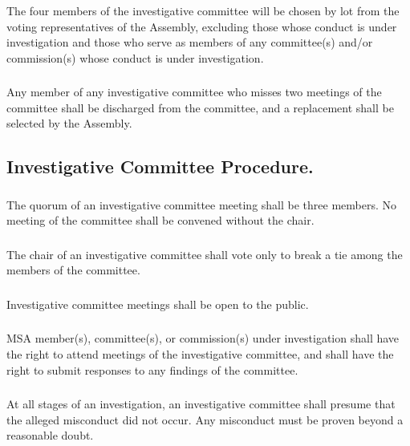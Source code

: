 \documentclass{rules}
\begin{document}
\subsubsection{}
The four members of the investigative committee will be chosen by lot from the voting representatives of the Assembly, excluding those whose conduct is under investigation and those who serve as members of any committee(s) and/or commission(s) whose conduct is under investigation.
\subsubsection{}
Any member of any investigative committee who misses two meetings of the committee shall be discharged from the committee, and a replacement shall be selected by the Assembly.
\subsection{Investigative Committee Procedure.}
\subsubsection{}
The quorum of an investigative committee meeting shall be three members.  No meeting of the committee shall be convened without the chair.
\subsubsection{}
The chair of an investigative committee shall vote only to break a tie among the members of the committee.
\subsubsection{}
Investigative committee meetings shall be open to the public.
\subsubsection{}
MSA member(s), committee(s), or commission(s) under investigation shall have the right to attend meetings of the investigative committee, and shall have the right to submit responses to any findings of the committee.
\subsubsection{}
At all stages of an investigation, an investigative committee shall presume that the alleged misconduct did not occur.  Any misconduct must be proven beyond a reasonable doubt.
\end{document}
